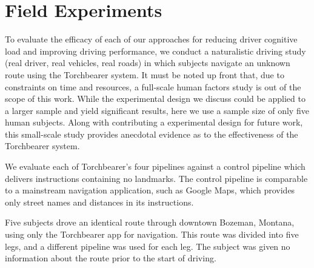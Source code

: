 \section{Field Experiments}

To evaluate the efficacy of each of our approaches for reducing driver cognitive load and improving driving performance, we conduct a naturalistic driving study (real driver, real vehicles, real roads) in which subjects navigate an unknown route using the Torchbearer system. It must be noted up front that, due to constraints on time and resources, a full-scale human factors study is out of the scope of this work. While the experimental design we discuss could be applied to a larger sample and yield significant results, here we use a sample size of only five human subjects. Along with contributing a experimental design for future work, this small-scale study provides anecdotal evidence as to the effectiveness of the Torchbearer system.


We evaluate each of Torchbearer's four pipelines against a control pipeline which delivers instructions containing no landmarks. The control pipeline is comparable to a mainstream navigation application, such as Google Maps, which provides only street names and distances in its instructions.

Five subjects drove an identical route through downtown Bozeman, Montana, using only the Torchbearer app for navigation. This route was divided into five legs, and a different pipeline was used for each leg. The subject was given no information about the route prior to the start of driving.